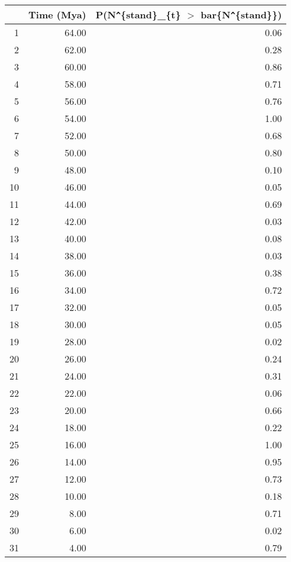 \begin{table}[ht]
\centering
\begin{tabular}{rrr}
  \hline
 & Time (Mya) & P(N\verb|^|\{stand\}\_\{t\} $>$ bar\{N\verb|^|\{stand\}\}) \\ 
  \hline
1 & 64.00 & 0.06 \\ 
  2 & 62.00 & 0.28 \\ 
  3 & 60.00 & 0.86 \\ 
  4 & 58.00 & 0.71 \\ 
  5 & 56.00 & 0.76 \\ 
  6 & 54.00 & 1.00 \\ 
  7 & 52.00 & 0.68 \\ 
  8 & 50.00 & 0.80 \\ 
  9 & 48.00 & 0.10 \\ 
  10 & 46.00 & 0.05 \\ 
  11 & 44.00 & 0.69 \\ 
  12 & 42.00 & 0.03 \\ 
  13 & 40.00 & 0.08 \\ 
  14 & 38.00 & 0.03 \\ 
  15 & 36.00 & 0.38 \\ 
  16 & 34.00 & 0.72 \\ 
  17 & 32.00 & 0.05 \\ 
  18 & 30.00 & 0.05 \\ 
  19 & 28.00 & 0.02 \\ 
  20 & 26.00 & 0.24 \\ 
  21 & 24.00 & 0.31 \\ 
  22 & 22.00 & 0.06 \\ 
  23 & 20.00 & 0.66 \\ 
  24 & 18.00 & 0.22 \\ 
  25 & 16.00 & 1.00 \\ 
  26 & 14.00 & 0.95 \\ 
  27 & 12.00 & 0.73 \\ 
  28 & 10.00 & 0.18 \\ 
  29 & 8.00 & 0.71 \\ 
  30 & 6.00 & 0.02 \\ 
  31 & 4.00 & 0.79 \\ 
   \hline
\end{tabular}
\label{tab:div_peak}
\end{table}
